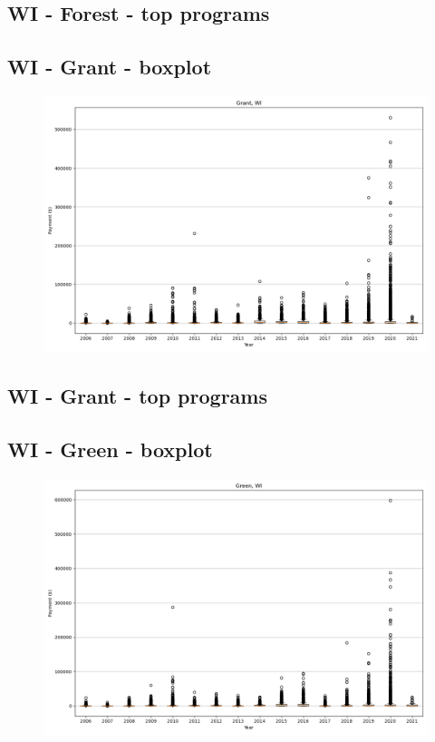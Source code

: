 \subsection*{WI - Forest - top programs}

\newpage
\subsection*{WI - Grant - boxplot}
\begin{figure}[h]
\centering
\includegraphics[width=7in]{../output/boxplots/counties/Grant-WI_boxplot.png}
\end{figure}


\subsection*{WI - Grant - top programs}

\newpage
\subsection*{WI - Green - boxplot}
\begin{figure}[h]
\centering
\includegraphics[width=7in]{../output/boxplots/counties/Green-WI_boxplot.png}
\end{figure}



